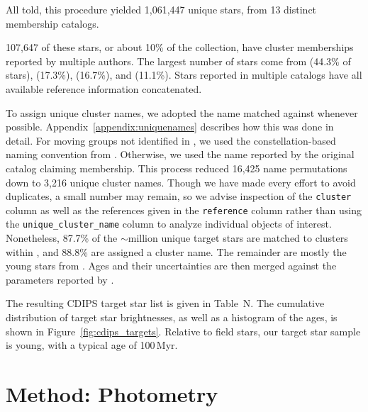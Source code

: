\documentclass[12pt,twocolumn,tighten]{aastex62}
\begin{document}
All told, this procedure yielded 1{,}061{,}447 unique stars, from 13 distinct
membership catalogs.

107{,}647 of these stars, or about
10\% of the collection, have cluster memberships reported by
multiple authors.  The largest number of stars come from
\citealt{dias_proper_2014} (44.3\% of stars), \citealt{Kharchenko_et_al_2013}
(17.3\%), \citealt{cantat-gaudin_gaia_2018} (16.7\%), and \citealt{zari_3d_2018}
(11.1\%). %
Stars reported in multiple catalogs have all available reference information
concatenated.  

To assign unique cluster names, we adopted the name matched against
\citet{Kharchenko_et_al_2013} whenever possible.
Appendix~\ref{appendix:uniquenames} describes  how this was done in detail.
For moving groups not identified in \citet{Kharchenko_et_al_2013}, we used
the constellation-based naming convention from
\citet{gagne_banyan_XI_2018}.  Otherwise, we used the name reported by
the original catalog claiming membership.  This process reduced 16,425
name permutations down to 3,216 unique cluster names.  Though we have
made every effort to avoid duplicates, a small number may remain, so we
advise inspection of the \texttt{cluster} column
as well as the references given in the
\texttt{reference} column rather than using the
\texttt{unique\_cluster\_name} column to analyze individual objects
of interest.  Nonetheless, 87.7\% of the $\sim$million unique target
stars are matched to clusters within \citet{Kharchenko_et_al_2013},
and 88.8\% are assigned a cluster name.  The remainder are mostly the
young stars from \citet{zari_3d_2018}.
Ages and their uncertainties are then merged against the 
parameters reported by \citet{Kharchenko_et_al_2013}.

The resulting CDIPS target star list is given in Table~N.
The cumulative distribution of target star brightnesses, as well as a
histogram of the ages, is shown in Figure~\ref{fig:cdips_targets}.
Relative to field stars, our target star sample is young, with a
typical age of 100$\,$Myr.






\section{Method: Photometry}
\label{sec:method}
\end{document}

